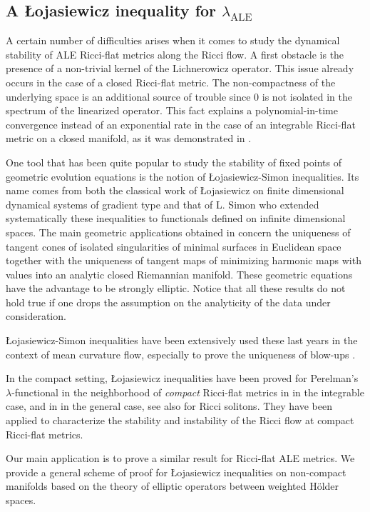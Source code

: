 \documentclass[a4paper,11pt,reqno]{amsart}
\numberwithin{equation}{section}
\begin{document}
	
	\subsection*{A \L{}ojasiewicz inequality for $\lambda_{\operatorname{ALE}}$}
	A certain number of difficulties arises when it comes to study the dynamical stability of ALE Ricci-flat metrics along the Ricci flow.
	A first obstacle is the presence of a non-trivial kernel of the Lichnerowicz operator. This issue already occurs in the case of a closed Ricci-flat metric. The non-compactness of the underlying space is an additional source of trouble since $0$ is not isolated in the spectrum of the linearized operator. This fact explains a polynomial-in-time convergence instead of an exponential rate in the case of an integrable Ricci-flat metric on a closed manifold, as it was demonstrated in \cite{Has-Sta}. 
	
	One tool that has been quite popular to study the stability of fixed points of  geometric evolution equations is the notion of \L{}ojasiewicz-Simon inequalities. Its name comes from both the classical work of \L{}ojasiewicz \cite{loj} on finite dimensional dynamical systems of gradient type and that of L. Simon \cite{sim} who extended systematically these inequalities to functionals defined on infinite dimensional spaces. The main geometric applications obtained in \cite{sim} concern the uniqueness of tangent cones of isolated singularities of minimal surfaces in Euclidean space together with the uniqueness of tangent maps of minimizing harmonic maps with values into an analytic closed Riemannian manifold. These geometric equations have the advantage to be strongly elliptic. Notice that all these results do not hold true if one drops the assumption on the analyticity of the data under consideration.

	 \L{}ojasiewicz-Simon inequalities have been extensively used these last years in the context of mean curvature flow, especially to prove the uniqueness of blow-ups \cite{Col-Min-Uni-MCF}. 
	
	In the compact setting, \L{}ojasiewicz inequalities have been proved for Perelman's $\lambda$-functional in the neighborhood of \emph{compact} Ricci-flat metrics in \cite{Has-Sta} in the integrable case, and in \cite{Has-Mul} in the general case, see also \cite{Kro-Sta-Ins} for Ricci solitons. They have been applied to characterize the stability and instability of the Ricci flow at compact Ricci-flat metrics. 
	
	
	Our main application is to prove a similar result for Ricci-flat ALE metrics. We provide a general scheme of proof for \L{}ojasiewicz inequalities on non-compact manifolds based on the theory of elliptic operators between weighted Hölder spaces.
	
\end{document}
